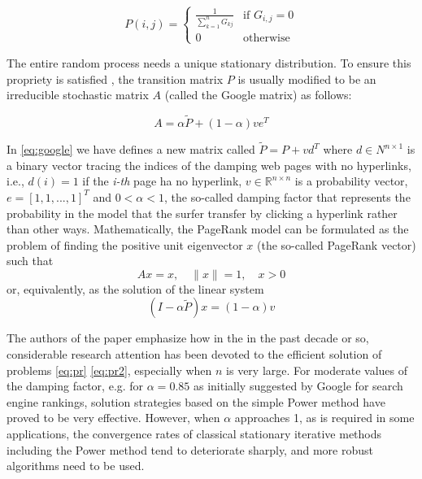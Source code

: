\documentclass[12pt]{article}
\newcommand{\R}{\mathbb{R}}
\begin{document}
\begin{equation}\label{eq:transition}
    P(i,j) =
    \begin{cases}
        \displaystyle \frac{1}{\sum_{k=1}^n G_{kj}} & \text{if } G_{i,j} = 0 \\
        0 & \text{otherwise}
    \end{cases}
\end{equation}

\noindent The entire random process needs a unique stationary distribution. To ensure this propriety is satisfied , the transition matrix $P$ is usually modified to be an irreducible stochastic matrix $A$ (called the Google matrix) as follows:


\begin{equation}\label{eq:google}
    A = \alpha \tilde P + (1 - \alpha)v e^T
\end{equation}

\noindent In \ref{eq:google} we have defines a new matrix called $\tilde P = P + vd^T$ where $d \in N^{n \times 1}$ is a binary vector tracing the indices of the damping web pages with no hyperlinks, i.e., $d(i) = 1$ if the \emph{i-th} page ha no hyperlink, $v \in \R^{n \times n}$ is a probability vector, $e = [1, 1, ... ,1]^T$ and $0<\alpha<1$, the so-called damping factor that represents the probability in the model that the surfer transfer by clicking a hyperlink rather than other ways. Mathematically, the PageRank model can be formulated as the problem of finding the positive unit eigenvector $x$ (the so-called PageRank vector) such that
\begin{equation}\label{eq:pr}
    Ax = x, \quad \lVert x \rVert = 1, \quad x > 0
\end{equation}
or, equivalently, as the solution of the linear system
\begin{equation}\label{eq:pr2}
    (I - \alpha \tilde P)x = (1 - \alpha)v
\end{equation}

\noindent The authors of the paper \cite{SHEN2022126799} emphasize how in the in the past decade or so, considerable research attention has been devoted to the efficient solution of problems \ref{eq:pr} \ref{eq:pr2}, especially when $n$ is very large. For moderate values of the damping factor, e.g. for $\alpha = 0.85$ as initially suggested by Google for search engine rankings, solution strategies based on the simple Power method have proved to be very effective. However, when $\alpha$ approaches 1, as is required in some applications, the convergence rates of classical stationary iterative methods including the Power method tend to deteriorate sharply, and more robust algorithms need to be used. \vspace*{0.4cm}
\end{document}
